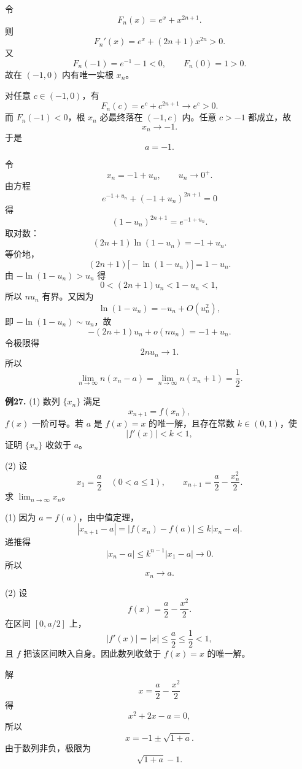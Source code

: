 \begin{solutionblock}

令
\[
F_n(x)=e^x+x^{2n+1}.
\]
则
\[
F_n' (x)=e^x+(2n+1)x^{2n}>0.
\]
又
\[
F_n(-1)=e^{-1}-1<0,\qquad F_n(0)=1>0.
\]
故在 \((-1,0)\) 内有唯一实根 \(x_n\)。

对任意 \(c\in(-1,0)\)，有
\[
F_n(c)=e^c+c^{2n+1}\to e^c>0.
\]
而 \(F_n(-1)<0\)，根 \(x_n\) 必最终落在 \((-1,c)\) 内。任意 \(c>-1\) 都成立，故
\[
x_n\to -1.
\]
于是
\[
a=-1.
\]

令
\[
x_n=-1+u_n,\qquad u_n\to0^+.
\]
由方程
\[
e^{-1+u_n}+(-1+u_n)^{2n+1}=0
\]
得
\[
(1-u_n)^{2n+1}=e^{-1+u_n}.
\]
取对数：
\[
(2n+1)\ln(1-u_n)=-1+u_n.
\]
等价地，
\[
(2n+1)\bigl[-\ln(1-u_n)\bigr]=1-u_n.
\]
由 \(-\ln(1-u_n)>u_n\) 得
\[
0<(2n+1)u_n<1-u_n<1,
\]
所以 \(nu_n\) 有界。又因为
\[
\ln(1-u_n)=-u_n+O(u_n^2),
\]
即 \(-\ln(1-u_n)\sim u_n\)，故
\[
-(2n+1)u_n+o(nu_n)=-1+u_n.
\]
令极限得
\[
2nu_n\to1.
\]
所以
\[
\lim_{n\to\infty}n(x_n-a)
=\lim_{n\to\infty}n(x_n+1)
=\frac12.
\]

\end{solutionblock}

\begin{problemblock}
\textbf{例27.} (1) 数列 \(\{x_n\}\) 满足
\[
x_{n+1}=f(x_n),
\]
\(f(x)\) 一阶可导。若 \(a\) 是 \(f(x)=x\) 的唯一解，且存在常数 \(k\in(0,1)\)，使
\[
|f'(x)|<k<1,
\]
证明 \(\{x_n\}\) 收敛于 \(a\)。

(2) 设
\[
x_1=\frac a2\quad(0<a\le1),\qquad
x_{n+1}=\frac a2-\frac{x_n^2}{2}.
\]
求 \(\displaystyle\lim_{n\to\infty}x_n\)。
\end{problemblock}

\begin{solutionblock}

(1) 因为 \(a=f(a)\)，由中值定理，
\[
|x_{n+1}-a|
=|f(x_n)-f(a)|
\le k|x_n-a|.
\]
递推得
\[
|x_n-a|\le k^{n-1}|x_1-a|\to0.
\]
所以
\[
x_n\to a.
\]

(2) 设
\[
f(x)=\frac a2-\frac{x^2}{2}.
\]
在区间 \([0,a/2]\) 上，
\[
|f'(x)|=|x|\le\frac a2\le\frac12<1,
\]
且 \(f\) 把该区间映入自身。因此数列收敛于 \(f(x)=x\) 的唯一解。

解
\[
x=\frac a2-\frac{x^2}{2}
\]
得
\[
x^2+2x-a=0,
\]
所以
\[
x=-1\pm\sqrt{1+a}.
\]
由于数列非负，极限为
\[
\sqrt{1+a}-1.
\]

\end{solutionblock}

